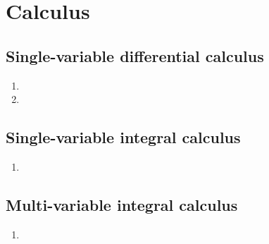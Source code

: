 \documentclass[a4paper]{book}
\begin{document}
	\chapter{Calculus}

	\section{Single-variable differential calculus}

	\begin{enumerate}
		\item
		\item
	\end{enumerate}

	\section{Single-variable integral calculus}

	\begin{enumerate}
		\item
	\end{enumerate}

	\section{Multi-variable integral calculus}

	\begin{enumerate}
		\item
	\end{enumerate}
\end{document}
